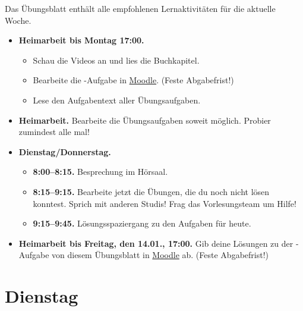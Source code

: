 \documentclass{uebung_cs}
\begin{document}
Das Übungsblatt enthält alle empfohlenen Lernaktivitäten für die aktuelle Woche.

\begin{itemize}
\item \textbf{Heimarbeit bis Montag 17:00.}
    \begin{itemize}
    \item 
    Schau die Videos an und lies die Buchkapitel.
    \item Bearbeite die -Aufgabe in \href{https://moodle.studiumdigitale.uni-frankfurt.de/moodle/course/view.php?id=2241}{Moodle}. (Feste Abgabefrist!)
    \item Lese den Aufgabentext aller Übungsaufgaben.
    \end{itemize}
\item \textbf{Heimarbeit.} Bearbeite die Übungsaufgaben soweit möglich. Probier zumindest alle mal!
\item \textbf{Dienstag/Donnerstag.}
\begin{itemize}
    \item \textbf{8:00--8:15.} Besprechung im Hörsaal.
    \item \textbf{8:15--9:15.} Bearbeite jetzt die Übungen, die du noch nicht lösen konntest. Sprich mit anderen Studis! Frag das Vorlesungsteam um Hilfe!
    \item \textbf{9:15--9:45.} Lösungsspaziergang zu den Aufgaben für heute.
\end{itemize}

\item \textbf{Heimarbeit bis Freitag, den 14.01., 17:00.} Gib deine Lösungen zu der -Aufgabe von diesem Übungsblatt in \href{https://moodle.studiumdigitale.uni-frankfurt.de/moodle/course/view.php?id=2241}{Moodle} ab. (Feste Abgabefrist!)
\end{itemize}

\section*{Dienstag}
\end{document}
